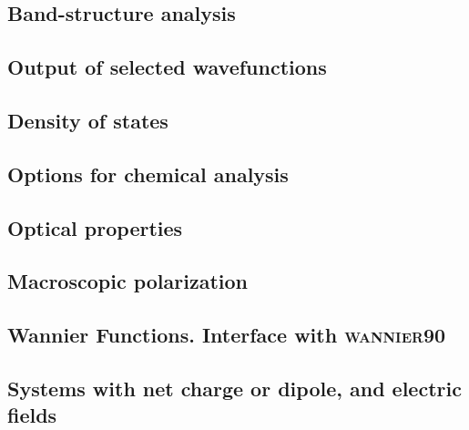 

\subsection{Band-structure analysis}
\label{sec:band-structure}



\subsection{Output of selected wavefunctions}
\label{sec:wf-output-user}



\subsection{Density of states}
\label{sec:dos}



\subsection{Options for chemical analysis}



\subsection{Optical properties}



\subsection{Macroscopic polarization}
\label{sec:macroscopic-polarization}



\subsection{Wannier Functions. Interface with \textsc{wannier90}}

\label{sec:wannier-functions}

\subsection{Systems with net charge or dipole, and electric fields}

